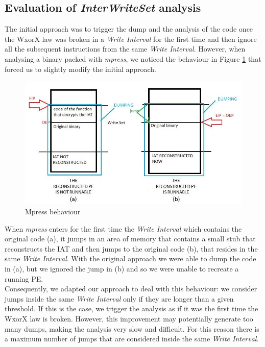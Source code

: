 \subsection{Evaluation of \textit{InterWriteSet} analysis}
The initial approach was to trigger the dump and the analysis of the code once the WxorX law was broken in a \textit{Write Interval} for the first time and then ignore all the subsequent instructions from the same \textit{Write Interval}. However, when analysing a binary packed with \textit{mpress}, we noticed the behaviour in Figure \ref{mpress behaviour} that forced us to slightly modify the initial approach.\\
\begin{figure}[!ht]
	\begin{center}
   		\includegraphics [width=\textwidth]{./pictures/InterWriteSet Analysis - mpress.jpg}
	\end{center}
	\caption{Mpress behaviour}
	\label{mpress behaviour}
\end{figure}
When \textit{mpress} enters for the first time the \textit{Write Interval} which contains the original code (a), it jumps in an area of memory that contains a small stub that reconstructs the \ac{IAT} and then jumps to the original code (b), that resides in the same \textit{Write Interval}. With the original approach we were able to dump the code in (a), but we ignored the jump in (b) and so we were unable to recreate a running \ac{PE}.\\
Consequently, we adapted our approach to deal with this behaviour: we consider jumps inside the same \textit{Write Interval} only if they are longer than a given threshold. If this is the case, we trigger the analysis as if it was the first time the WxorX law is broken. However, this improvement may potentially generate too many dumps, making the analysis very slow and difficult. For this reason there is a maximum number of jumps that are considered inside the same \textit{Write Interval}.